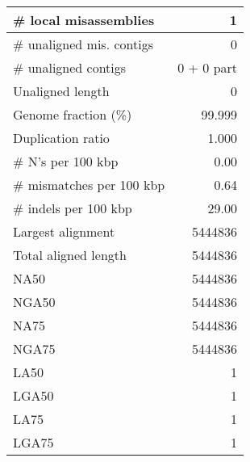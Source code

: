 \documentclass[12pt,a4paper]{article}
\begin{document}
\begin{table}[ht]
\begin{center}
\begin{tabular}{|l*{1}{|r}|}
\# local misassemblies & 1 \\ \hline
\# unaligned mis. contigs & 0 \\ \hline
\# unaligned contigs & 0 + 0 part \\ \hline
Unaligned length & 0 \\ \hline
Genome fraction (\%) & 99.999 \\ \hline
Duplication ratio & 1.000 \\ \hline
\# N's per 100 kbp & 0.00 \\ \hline
\# mismatches per 100 kbp & 0.64 \\ \hline
\# indels per 100 kbp & 29.00 \\ \hline
Largest alignment & 5444836 \\ \hline
Total aligned length & 5444836 \\ \hline
NA50 & 5444836 \\ \hline
NGA50 & 5444836 \\ \hline
NA75 & 5444836 \\ \hline
NGA75 & 5444836 \\ \hline
LA50 & 1 \\ \hline
LGA50 & 1 \\ \hline
LA75 & 1 \\ \hline
LGA75 & 1 \\ \hline
\end{tabular}
\end{center}
\end{table}
\end{document}
